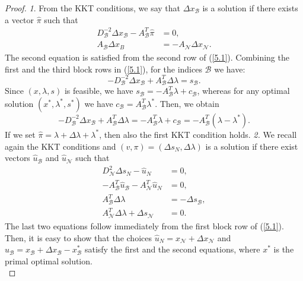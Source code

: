 \documentclass[a4paper,10 pt,titlepage,twoside]{book}
\theoremstyle{plain}
\theoremstyle{definition}
\theoremstyle{remark}
\begin{document}
\begin{proof}
	\textit{1}. From the KKT conditions, we say that $\Delta x_{\mathcal{B}}$ is a solution if there exists a vector $\hat{\pi}$ such that
	\begin{align*}
	D_{\mathcal{B}}^{-2}\Delta x_{\mathcal{B}}-A_{\mathcal{B}}^{T}\hat{\pi}&= 0,\\
	A_{\mathcal{B}}\Delta x_{B}&= -A_{\mathcal{N}}\Delta x_{\mathcal{N}}.
	\end{align*}
	The second equation is satisfied from the second row of (\ref{5.1}). Combining the first and the third block rows in (\ref{5.1}), for the indices $\mathcal{B}$ we have:
	\begin{equation*}
	-D_{\mathcal{B}}^{-2}\Delta x_{\mathcal{B}} + A_{\mathcal{B}}^{T}\Delta \lambda = s_{\mathcal{B}}.
	\end{equation*}
	Since $(x, \lambda, s)$ is feasible, we have $s_{\mathcal{B}}= -A_{\mathcal{B}}^{T}\lambda+ c_{\mathcal{B}}$, whereas for any optimal solution $(x^{*}, \lambda^{*}, s^{*})$ we have $c_{\mathcal{B}}= A_{\mathcal{B}}^{T}\lambda^{*}$. Then, we obtain
	\begin{equation*}
	-D_{\mathcal{B}}^{-2}\Delta x_{\mathcal{B}} + A_{\mathcal{B}}^{T}\Delta \lambda = -A_{\mathcal{B}}^{T}\lambda+ c_{\mathcal{B}} = -A_{\mathcal{B}}^{T}(\lambda - \lambda^{*}). 
	\end{equation*}
	If we set $\hat{\pi} = \lambda + \Delta\lambda + \lambda^{*}$, then also the first KKT condition holds.\newline
	\textit{2.} We recall again the KKT conditions and $(v,\pi)=(\Delta s_{N},\Delta\lambda)$ is a solution if there exist vectors $\hat{u}_{\mathcal{B}}$ and $\hat{u}_{\mathcal{N}}$ such that
	\begin{align*}
	D_{\mathcal{N}}^{2}\Delta s_{N}-\hat{u}_{N}&=0,\\
	-A_{\mathcal{B}}^{T}\hat{u}_{\mathcal{B}}-A_{\mathcal{N}}^{T}\hat{u}_{N}&=0,\\
	A_{\mathcal{B}}^{T}\Delta \lambda &= -\Delta s_{\mathcal{B}},\\
	A_{\mathcal{N}}^{T}\Delta\lambda + \Delta s_{\mathcal{N}} &=0. 
	\end{align*}
	The last two equations follow immediately from the first block row of (\ref{5.1}).\\
	Then, it is easy to show that the choices $\hat{u}_{N}= x_{\mathcal{N}}+\Delta x_{\mathcal{N}}$ and $\hat{u}_{\mathcal{B}}=x_{\mathcal{B}}+\Delta x_{\mathcal{B}}-x_{\mathcal{B}}^{*}$ satisfy the first and the second equations, where $x^{*}$ is the primal optimal solution.\\

\end{proof}
\end{document}

